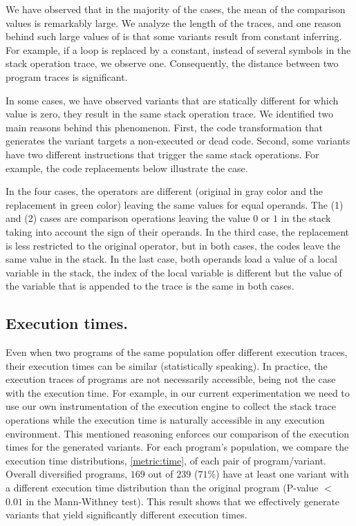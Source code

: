We have observed that in the majority of the cases, the mean of the comparison values is remarkably large. We analyze the length of the traces, and one reason behind such large values of \DTW is that some variants result from constant inferring. For example, if a loop is replaced by a constant, instead of several symbols in the stack operation trace, we observe one. Consequently, the distance between two program traces is significant. 

In some cases, we have observed variants that are statically different for which \DTW value is zero, \ie they result in the same stack operation trace. We identified two main reasons behind this phenomenon. First, the code transformation that generates the variant targets a non-executed or dead code. Second, some variants have two different instructions that trigger the same stack operations. For example, the code replacements below illustrate the case. 



In the four cases, the operators are different (original in gray color and the replacement in green color) leaving the same values for equal operands.
The (1) and (2) cases are comparison operations leaving the value $0$ or $1$ in the stack taking into account the sign of their operands.  In the third case, the replacement is less restricted to the original operator, but in both cases, the codes leave the same value in the stack. In the last case, both operands load a value of a local variable in the stack, the index of the local variable is different but the value of the variable that is appended to the trace is the same in both cases. 

\subsection*{Execution times.}


Even when two programs of the same population offer different execution traces, their execution times can be similar (statistically speaking). In practice, the execution traces of \wasm programs are not necessarily accessible, being not the case with the execution time. For example, in our current experimentation we need to use our own instrumentation of the execution engine to collect the stack trace operations while the execution time is naturally accessible in any execution environment. This mentioned reasoning enforces our comparison of the execution times for the generated variants.
For each program's population, we compare the execution time distributions, \autoref{metric:time}, of each pair of program/variant.
Overall diversified programs, $169$ out of $239$ ($71\%$) have at least one variant with a different execution time distribution than the original program (P-value $<$ $0.01$ in the Mann-Withney test). This result shows that we effectively generate variants that yield significantly different execution times.

